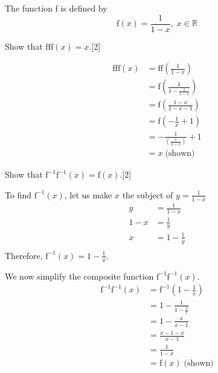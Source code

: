 \documentclass[12pt, a4 paper]{article}
\begin{document}
\begin{outline}[enumerate]
 \1 The function f is defined by \[\textrm{f}(x)=\frac{1}{1-x},\;x\in \mathbb{R}\]

 \2 Show that $\textrm{f}\textrm{f}\textrm{f}(x)=x$.\hfill[2]
 \begin{answer}
  \begin{align*}
   \textrm{f}\textrm{f}\textrm{f}(x) & =\textrm{f}\textrm{f}\left(\frac{1}{1-x}\right)    \\
                                     & = \textrm{f}\left(\frac{1}{1-\frac{1}{1-x}}\right) \\
                                     & = \textrm{f}\left(\frac{1-x}{1-x-1}\right)         \\
                                     & = \textrm{f}\left(-\frac{1}{x}+1\right)            \\
                                     & = -\frac{1}{(\frac{1}{1-x})}+1                     \\
                                     & = x\;\textrm{(shown)}
  \end{align*}
 \end{answer}
 \2 Show that $\textrm{f}^{-1}\textrm{f}^{-1}(x)=\textrm{f}(x)$.\hfill[2]
 \begin{answer}
  To find $\textrm{f}^{-1}(x)$, let us make $x$ the subject of $y=\frac{1}{1-x}$
  \begin{align*}
   y   & = \frac{1}{1-x}   \\
   1-x & = \frac{1}{y}     \\
   x   & = 1 - \frac{1}{y} \\
  \end{align*}
  Therefore, $\textrm{f}^{-1}(x) = 1 - \frac{1}{x}$.
 \end{answer}
 \begin{answer}
  We now simplify the composite function $\textrm{f}^{-1}\textrm{f}^{-1}(x).$
  \begin{align*}
   \textrm{f}^{-1}\textrm{f}^{-1}(x) & = \textrm{f}^{-1}(1 - \frac{1}{x}) \\
                                     & = 1 - \frac{1}{1 - \frac{1}{x}}    \\
                                     & = 1 - \frac{x}{x-1}                \\
                                     & = \frac{x-1-x}{x-1}                \\
                                     & = \frac{1}{1-x}                    \\
                                     & = \textrm{f}(x)\;\textrm{(shown)}

\end{align*}
\end{answer}
\end{outline}
\end{document}
